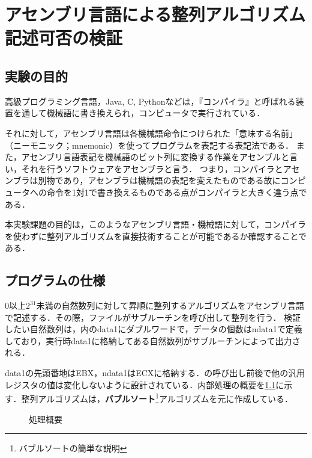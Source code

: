 \chapter{アセンブリ言語による整列アルゴリズム記述可否の検証}
\section{実験の目的}
高級プログラミング言語，{\ttfamily Java, C, Python}などは，『コンパイラ』と呼ばれる装置を通して機械語に書き換えられ，コンピュータで実行されている．\par
それに対して，アセンブリ言語は各機械語命令につけられた「意味する名前」（ニーモニック；mnemonic）を使ってプログラムを表記する表記法である．\cite{pl2text}
また，アセンブリ言語表記を機械語のビット列に変換する作業をアセンブルと言い，それを行うソフトウェアをアセンブラと言う．
つまり，コンパイラとアセンブラは別物であり，アセンブラは機械語の表記を変えたものである故にコンピュータへの命令を1対1で書き換えるものである点がコンパイラと大きく違う点である．\par
本実験課題の目的は，このようなアセンブリ言語・機械語に対して，コンパイラを使わずに整列アルゴリズムを直接技術することが可能であるか確認することである．
\section{プログラムの仕様}
\(0\)以上\(2^{31}\)未満の自然数列に対して昇順に整列するアルゴリズムをアセンブリ言語で記述する．その際，\testsort ファイルが\sort サブルーチンを呼び出して整列を行う．
検証したい自然数列は，\testsort 内の{\ttfamily data1}にダブルワードで，データの個数は{\ttfamily ndata1}で定義しており，\testsort 実行時{\ttfamily data1}に格納してある自然数列が\print サブルーチンによって出力される．\par
{\ttfamily data1}の先頭番地は{\ttfamily EBX}，{\ttfamily ndata1}は{\ttfamily ECX}に格納する．\sort の呼び出し前後で他の汎用レジスタの値は変化しないように設計されている．内部処理の概要を\ref{kadai1:abs}に示す．整列アルゴリズムは，\textbf{バブルソート}\footnote{バブルソートの簡単な説明}アルゴリズムを元に作成している．
\begin{figure}[h]
    \centering
    \caption{処理概要}
    \label{kadai1:abs}
\end{figure}
